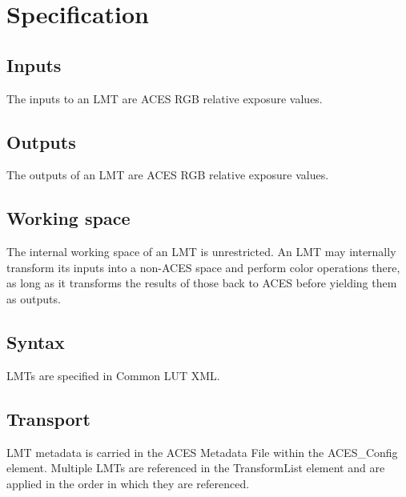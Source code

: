\regularsectionformat	%
\chapter{Specification}

\section{Inputs}
The inputs to an LMT are ACES RGB relative exposure values.

\section{Outputs}
The outputs of an LMT are ACES RGB relative exposure values.

\section{Working space}
The internal working space of an LMT is unrestricted. An LMT may internally transform its inputs into a non-ACES space and perform color operations there, as long as it transforms the results of those back to ACES before yielding them as outputs.

\section{Syntax}
LMTs are specified in Common LUT XML.

\section{Transport}
LMT metadata is carried in the ACES Metadata File within the ACES\_Config element. Multiple LMTs are referenced in the TransformList element and are applied in the order in which they are referenced.